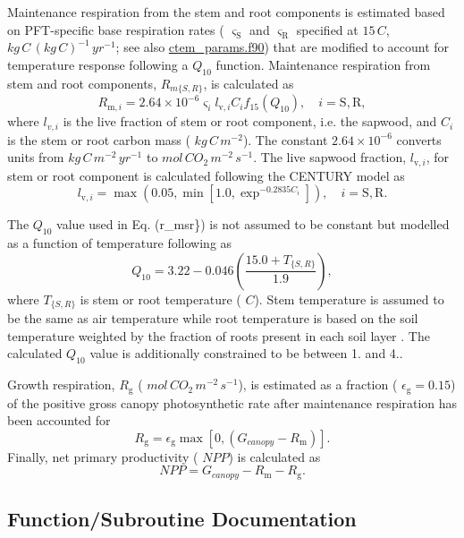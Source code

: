 Maintenance respiration from the stem and root components is estimated based on P\+F\+T-\/specific base respiration rates ( $\varsigma_\mathrm{S}$ and $\varsigma_\mathrm{R}$ specified at $15\,C$, $kg\,C\,(kg\,C)^{-1}\,yr^{-1}$; see also \hyperlink{ctem__params_8f90}{ctem\+\_\+params.\+f90}) that are modified to account for temperature response following a $Q_{10}$ function. Maintenance respiration from stem and root components, $R_{m\{S,R\}}$, is calculated as \[ \label{r_msr} R_{\mathrm{m},i} = 2.64 \times 10^{-6}\varsigma_{i}l_{\mathrm{v}, i}C_{i}f_{15}(Q_{10}),\quad i = \mathrm{S}, \mathrm{R}, \] where $l_{v,i}$ is the live fraction of stem or root component, i.\+e. the sapwood, and $C_i$ is the stem or root carbon mass ( $kg\,C\,m^{-2}$). The constant $2.64 \times 10^{-6}$ converts units from $kg\,C\,m^{-2}\,yr^{-1}$ to $mol\,CO_2\,m^{-2}\,s^{-1}$. The live sapwood fraction, $l_{\mathrm{v},i}$, for stem or root component is calculated following the C\+E\+N\+T\+U\+R\+Y model \cite{Parton1996-zv} as \[ l_{\mathrm{v},i} = \max(0.05, \min[1.0, \exp^{-0.2835 C_i} ]),\quad i = \mathrm{S}, \mathrm{R}. \]

The $Q_{10}$ value used in Eq. (r\+\_\+msr\}) is not assumed to be constant but modelled as a function of temperature following \cite{Tjoelker2001-uz} as \[ Q_{10} = 3.22 - 0.046 \left(\frac{15.0 + T_{\{S,R\}}}{1.9}\right), \] where $T_{\{S,R\}}$ is stem or root temperature ( $C$). Stem temperature is assumed to be the same as air temperature while root temperature is based on the soil temperature weighted by the fraction of roots present in each soil layer \cite{Arora2003838}. The calculated $Q_{10}$ value is additionally constrained to be between 1. and 4..

Growth respiration, $R_\mathrm{g}$ ( $mol\,CO_2\,m^{-2}\,s^{-1}$), is estimated as a fraction ( $\epsilon_\mathrm{g}=0.15$) of the positive gross canopy photosynthetic rate after maintenance respiration has been accounted for \[ \label{growth_res} R_\mathrm{g}=\epsilon_\mathrm{g}\max[0,(G_{canopy} - R_\mathrm{m})]. \] Finally, net primary productivity ( $NPP$) is calculated as \[ NPP = G_{canopy} - R_\mathrm{m} - R_\mathrm{g}. \] 

\subsection{Function/\+Subroutine Documentation}
\hypertarget{mainres_8f_ac938116d4fe4ed360f4fb9fc8ab39db3}{}
